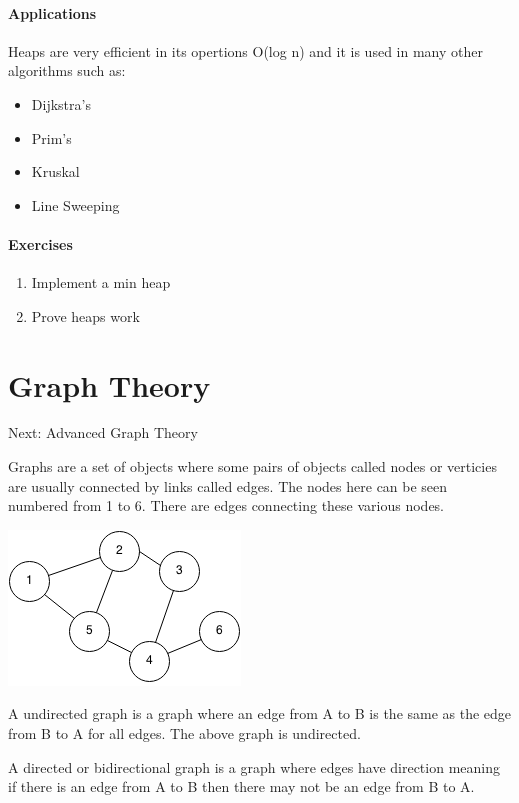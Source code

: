 \documentclass[11pt,oneside]{book}
\makeatletter
\def\maxwidth#1{\ifdim\Gin@nat@width>#1 #1\else\Gin@nat@width\fi}
\makeatother
\begin{document}
\subsection{Applications}

Heaps are very efficient in its opertions O(log n) and it is used in many other algorithms such as:

\begin{itemize}
\item Dijkstra's
\item Prim's
\item Kruskal
\item Line Sweeping
\end{itemize}

\subsection{Exercises}

\begin{enumerate}
\item Implement a min heap
\item Prove heaps work
\end{enumerate}

\part{ Graph Theory }
    

Next: Advanced Graph Theory

Graphs are a set of objects where some pairs of objects  called nodes or verticies are usually connected by links called edges. The nodes here can be seen numbered from 1 to 6. There are edges connecting these various nodes.

\vspace{5px}\includegraphics[width=\maxwidth{\textwidth}]{graph.png}

A undirected graph is a graph where an edge from A to B is the same as the edge from B to A for all edges. The above graph is undirected.

A directed or bidirectional graph is a graph where edges have direction meaning if there is an edge from A to B then there may not be an edge from B to A.
\end{document}
